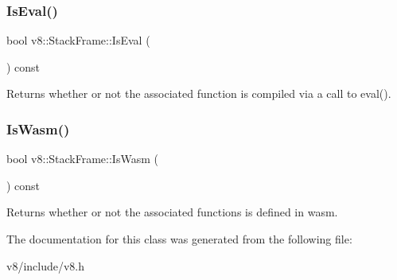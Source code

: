 \subsubsection{\texorpdfstring{Is\+Eval()}{IsEval()}}
{\footnotesize\ttfamily bool v8\+::\+Stack\+Frame\+::\+Is\+Eval (\begin{DoxyParamCaption}{ }\end{DoxyParamCaption}) const}

Returns whether or not the associated function is compiled via a call to eval(). \mbox{\label{classv8_1_1StackFrame_aec6d28360828b8cadc3da6a5dbd83d89}} 
\subsubsection{\texorpdfstring{Is\+Wasm()}{IsWasm()}}
{\footnotesize\ttfamily bool v8\+::\+Stack\+Frame\+::\+Is\+Wasm (\begin{DoxyParamCaption}{ }\end{DoxyParamCaption}) const}

Returns whether or not the associated functions is defined in wasm. 

The documentation for this class was generated from the following file\+:\begin{DoxyCompactItemize}
\item 
v8/include/v8.\+h\end{DoxyCompactItemize}
